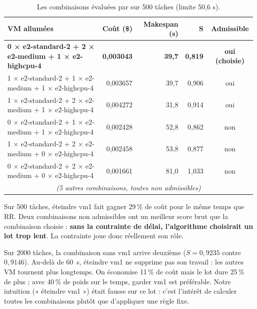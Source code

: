 \begin{table}[H]
\centering\footnotesize
\begin{tabular}{lrrrc}
\toprule
\textbf{VM allumées} & \textbf{Coût (\$)} & \textbf{Makespan (s)} & $\boldsymbol{S}$ & \textbf{Admissible} \\
\midrule
\textbf{0 × e2-standard-2 + 2 × e2-medium + 1 × e2-highcpu-4} & \textbf{0,003043} & \textbf{39,7} & \textbf{0,819} & \textbf{oui (choisie)} \\
1 × e2-standard-2 + 1 × e2-medium + 1 × e2-highcpu-4 & 0,003657 & 39,7 & 0,906 & oui \\
1 × e2-standard-2 + 2 × e2-medium + 1 × e2-highcpu-4 & 0,004272 & 31,8 & 0,914 & oui \\
0 × e2-standard-2 + 1 × e2-medium + 1 × e2-highcpu-4 & 0,002428 & 52,8 & 0,862 & non \\
1 × e2-standard-2 + 2 × e2-medium + 0 × e2-highcpu-4 & 0,002458 & 53,8 & 0,877 & non \\
0 × e2-standard-2 + 2 × e2-medium + 0 × e2-highcpu-4 & 0,001661 & 81,0 & 1,033 & non \\
\multicolumn{5}{c}{\footnotesize\textit{(5 autres combinaisons, toutes non admissibles)}} \\
\bottomrule
\end{tabular}
\caption{Les combinaisons évaluées par \sel{} sur 500 tâches (limite 50,6 s).}
\label{tab:explain500}
\end{table}

Sur 500 tâches, éteindre vm1 fait gagner 29\,\% de coût pour le même temps que RR.
Deux combinaisons non admissibles ont un meilleur score brut que la combinaison
choisie : \textbf{sans la contrainte de délai, l'algorithme choisirait un lot trop
lent}. La contrainte joue donc réellement son rôle.

Sur 2000 tâches, la combinaison sans vm1 arrive deuxième ($S = 0{,}9235$ contre
$0{,}9146$). Au-delà de 60~s, éteindre vm1 ne supprime pas son travail : les autres
VM tournent plus longtemps. On économise 11\,\% de coût mais le lot dure 25\,\% de
plus ; avec 40\,\% de poids sur le temps, garder vm1 est préférable. Notre intuition
(« éteindre vm1 ») était fausse sur ce lot : c'est l'intérêt de calculer toutes les
combinaisons plutôt que d'appliquer une règle fixe.
